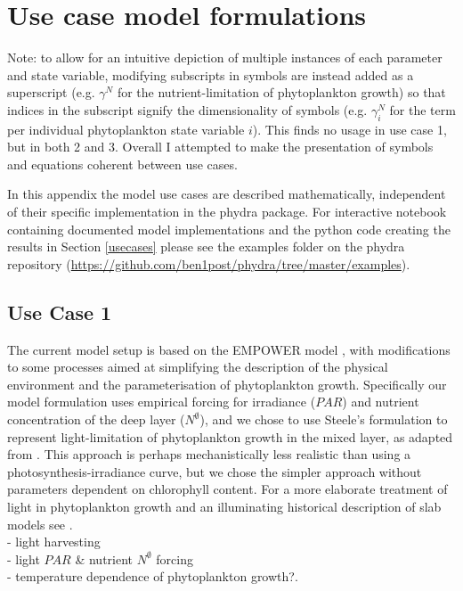 \documentclass[template.tex]{subfiles}
\begin{document}
\section{Use case model formulations}

Note: to allow for an intuitive depiction of multiple instances of each parameter and state variable, modifying subscripts in symbols are instead added as a superscript (e.g. $\gamma^{N}$ for the nutrient-limitation of phytoplankton growth) so that indices in the subscript signify the dimensionality of symbols (e.g. $\gamma^{N}_i$ for the term per individual phytoplankton state variable $i$). This finds no usage in use case 1, but in both 2 and 3.
Overall I attempted to make the presentation of symbols and equations coherent between use cases.

In this appendix the model use cases are described mathematically, independent of their specific implementation in the phydra package. For interactive notebook containing documented model implementations and the python code creating the results in Section \ref{usecases} please see the examples folder on the phydra repository (\url{https://github.com/ben1post/phydra/tree/master/examples}).


\subsection{Use Case 1}
The current model setup is based on the EMPOWER model \citep{Anderson2015c}, with modifications to some processes aimed at simplifying the description of the physical environment and the parameterisation of phytoplankton growth. 
Specifically our model formulation uses empirical forcing for irradiance ($PAR$) and nutrient concentration of the deep layer ($N^\emptyset$), and we chose to use Steele's formulation to represent light-limitation of phytoplankton growth in the mixed layer, as adapted from \cite{Acevedo-Trejos2016}. This approach is perhaps mechanistically less realistic than using a photosynthesis-irradiance curve, but we chose the simpler approach without parameters dependent on chlorophyll content. For a more elaborate treatment of light in phytoplankton growth and an illuminating historical description of slab models see \citet{Anderson2015c}.\\

- light harvesting\\
- light $PAR$ & nutrient $N^\emptyset$ forcing\\ 
- temperature dependence of phytoplankton growth?.\\ 
\end{document}
